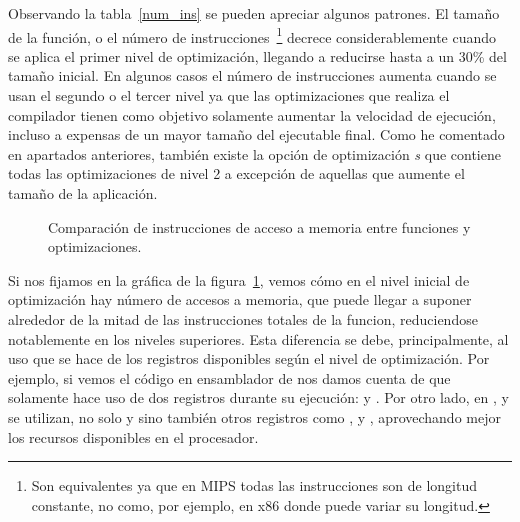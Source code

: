 Observando la tabla~\ref{num_ins} se pueden apreciar algunos patrones. El tamaño de la función, o el número de instrucciones~\footnote{Son equivalentes ya que en MIPS todas las instrucciones son de longitud constante, no como, por ejemplo, en x86 donde puede variar su longitud.} decrece considerablemente cuando se aplica el primer nivel de optimización, llegando a reducirse hasta a un 30\% del tamaño inicial. En algunos casos el número de instrucciones aumenta cuando se usan el segundo o el tercer nivel ya que las optimizaciones que realiza el compilador tienen como objetivo solamente aumentar la velocidad de ejecución, incluso a expensas de un mayor tamaño del ejecutable final. Como he comentado en apartados anteriores, también existe la opción de optimización \textit{s} que contiene todas las optimizaciones de nivel 2 a excepción de aquellas que aumente el tamaño de la aplicación.

\begin{figure}[htbp]
\begin{center}
\end{center}
\caption{Comparación de instrucciones de acceso a memoria entre funciones y optimizaciones.}
\label{graph:memoria}
\end{figure}

Si nos fijamos en la gráfica de la figura~\ref{graph:memoria}, vemos cómo en el nivel inicial de optimización hay número de accesos a memoria, que puede llegar a suponer alrededor de la mitad de las instrucciones totales de la funcion, reduciendose notablemente en los niveles superiores. Esta diferencia se debe, principalmente, al uso que se hace de los registros disponibles según el nivel de optimización. Por ejemplo, si vemos el código en ensamblador de  nos damos cuenta de que solamente hace uso de dos registros durante su ejecución:  y . Por otro lado, en ,  y  se utilizan, no solo  y  sino también otros registros como ,  y , aprovechando mejor los recursos disponibles en el procesador.

